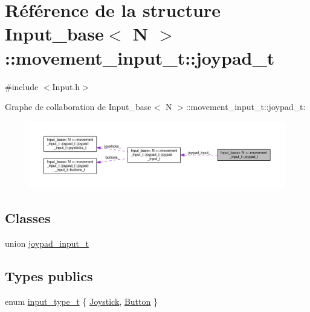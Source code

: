 \hypertarget{struct_input__base_1_1movement__input__t_1_1joypad__t}{}\section{Référence de la structure Input\+\_\+base$<$ N $>$\+:\+:movement\+\_\+input\+\_\+t\+:\+:joypad\+\_\+t}
\label{struct_input__base_1_1movement__input__t_1_1joypad__t}


{\ttfamily \#include $<$Input.\+h$>$}



Graphe de collaboration de Input\+\_\+base$<$ N $>$\+:\+:movement\+\_\+input\+\_\+t\+:\+:joypad\+\_\+t\+:\nopagebreak
\begin{figure}[H]
\begin{center}
\leavevmode
\includegraphics[width=350pt]{struct_input__base_1_1movement__input__t_1_1joypad__t__coll__graph}
\end{center}
\end{figure}
\subsection*{Classes}
\begin{DoxyCompactItemize}
\item 
union \hyperlink{union_input__base_1_1movement__input__t_1_1joypad__t_1_1joypad__input__t}{joypad\+\_\+input\+\_\+t}
\end{DoxyCompactItemize}
\subsection*{Types publics}
\begin{DoxyCompactItemize}
\item 
enum \hyperlink{struct_input__base_1_1movement__input__t_1_1joypad__t_a85cbe03962d167ab3a70fb322aa9d09d}{input\+\_\+type\+\_\+t} \{ \hyperlink{struct_input__base_1_1movement__input__t_1_1joypad__t_a85cbe03962d167ab3a70fb322aa9d09da1bc047d60889a94bb18a57fcac21e40e}{Joystick}, 
\hyperlink{struct_input__base_1_1movement__input__t_1_1joypad__t_a85cbe03962d167ab3a70fb322aa9d09daea44ebdf8389e1157e5d65eb04998623}{Button}
 \}
\end{DoxyCompactItemize}
